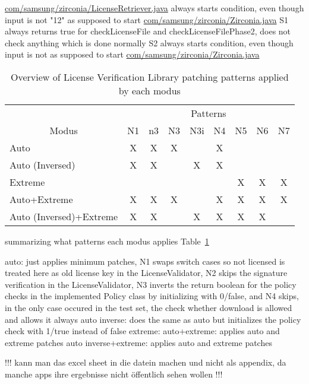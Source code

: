 \url{com/samsung/zirconia/LicenseRetriever.java}
always starts condition, even though input is not "12" as supposed to start
\url{com/samsung/zirconia/Zirconia.java}
S1
always returns true for checkLicenseFile and checkLicenseFilePhase2, does not check anything which is done normally
S2
always starts condition, even though input is not as supposed to start
\url{com/samsung/zirconia/Zirconia.java}
\begin{table}[h]
\centering
\begin{tabular}{l|cccccccc}
                           & \multicolumn{8}{c}{Patterns}           \\
\multicolumn{1}{c|}{Modus} & N1 & n3 & N3 & N3i & N4 & N5 & N6 & N7 \\ \hline
Auto                       & X  & X  & X  &     & X  &    &    &    \\
Auto (Inversed)            & X  & X  &    & X   & X  &    &    &    \\
Extreme                    &    &    &    &     &    & X  & X  & X  \\
Auto+Extreme               & X  & X  & X  &     & X  & X  & X  & X  \\
Auto (Inversed)+Extreme    & X  & X  &    & X   & X  & X  & X  &
\end{tabular}
\caption{Overview of License Verification Library patching patterns applied by each modus}
\label{table:patterns}
\end{table}



summarizing what patterns each modus applies Table~\ref{table:patterns}


auto: just applies minimum patches, N1 swaps switch cases so not licensed is treated here as old license key in the LicenseValidator, N2 skips the signature verification in the LicenseValidator, N3 inverts the return boolean for the policy checks in the implemented Policy class by initializing with 0/false, and N4 skips, in the only case occured in the test set, the check whether download is allowed and allows it always
auto inverse: does the same as auto but initializes the policy check with 1/true instead of false
extreme:
auto+extreme: applies auto and extreme patches
auto inverse+extreme: applies auto and extreme patches




!!! kann man das excel sheet in die datein machen und nicht als appendix, da manche apps ihre ergebnisse nicht öffentlich sehen wollen !!!
